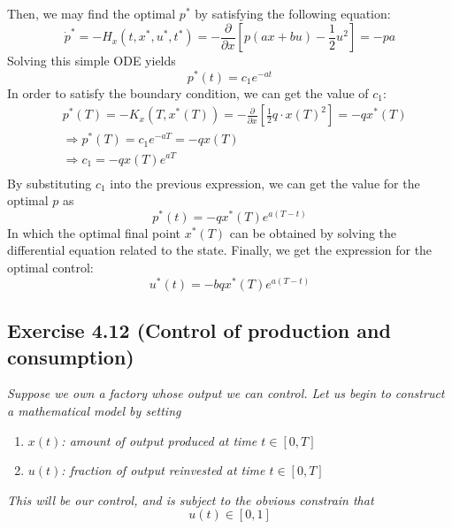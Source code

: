 Then, we may find the optimal $p^*$ by satisfying the following equation:
\begin{equation}
    \Dot{p}^* = - H_x(t, x^*, u^*, t^*) = - \frac{\partial}{\partial x}  \left[ p(ax + bu) - \frac{1}{2}u^2 \right]  = - pa
\end{equation}
Solving this simple ODE yields
\begin{equation}
    p^*(t) = c_1 e^{-at}
\end{equation}
In order to satisfy the boundary condition, we can get the value of $c_1$:
\begin{align}
    &p^*(T) = -K_x(T, x^*(T)) = - \frac{\partial}{\partial x} \left[ \frac{1}{2}q \cdot x(T)^2 \right] = -qx^*(T)\\
    &\Longrightarrow p^*(T) = c_1 e^{-a T} = - q x(T)\\
    &\Longrightarrow c_1 = -q x(T) e^{aT}\\
\end{align}
By substituting $c_1$ into the previous expression, we can get the value for the optimal $p$ as
\begin{equation}
    p^*(t) = -qx^*(T)e^{a(T-t)}
\end{equation}
In which the optimal final point $x^*(T)$ can be obtained by solving the differential equation related to the state. Finally, we get the expression for the optimal control:
\begin{equation}
    u^*(t) = -bqx^*(T)e^{a(T-t)}
\end{equation}

\subsection{Exercise 4.12 (Control of production and consumption)}

\emph{Suppose we own a factory whose output we can control. Let us begin to construct a mathematical model by setting}

\begin{enumerate}
    \item \emph{$x(t)$: amount of output produced at time $ t \in [0,T]$}
    \item \emph{$u(t)$: fraction of output reinvested at time $t \in [0,T]$}
\end{enumerate}

\emph{This will be our control, and is subject to the obvious constrain that }
\begin{equation}
    u(t) \in [0,1]
\end{equation}

